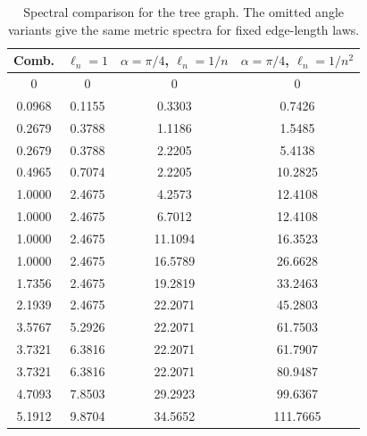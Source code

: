 \begin{table}[htbp]
\centering
\scriptsize
\begin{tabular}{c c c c}
\hline
Comb. & $\ell_n=1$ & $\alpha=\pi/4$, $\ell_n=1/n$ & $\alpha=\pi/4$, $\ell_n=1/n^2$ \\
\hline
0 & 0 & 0 & 0 \\
0.0968 & 0.1155 & 0.3303 & 0.7426 \\
0.2679 & 0.3788 & 1.1186 & 1.5485 \\
0.2679 & 0.3788 & 2.2205 & 5.4138 \\
0.4965 & 0.7074 & 2.2205 & 10.2825 \\
1.0000 & 2.4675 & 4.2573 & 12.4108 \\
1.0000 & 2.4675 & 6.7012 & 12.4108 \\
1.0000 & 2.4675 & 11.1094 & 16.3523 \\
1.0000 & 2.4675 & 16.5789 & 26.6628 \\
1.7356 & 2.4675 & 19.2819 & 33.2463 \\
2.1939 & 2.4675 & 22.2071 & 45.2803 \\
3.5767 & 5.2926 & 22.2071 & 61.7503 \\
3.7321 & 6.3816 & 22.2071 & 61.7907 \\
3.7321 & 6.3816 & 22.2071 & 80.9487 \\
4.7093 & 7.8503 & 29.2923 & 99.6367 \\
5.1912 & 9.8704 & 34.5652 & 111.7665 \\
\hline
\end{tabular}
\caption{Spectral comparison for the tree graph. The omitted angle variants give the same metric spectra for fixed edge-length laws.}
\label{tab:spectral_tree_comparison_compact}
\end{table}
